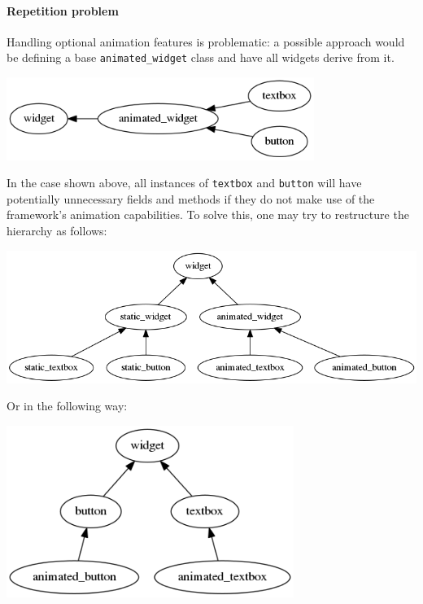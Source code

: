 \documentclass[oneside, 12pt, a4paper, openany]{book}
\let\origfigure=\figure
\let\endorigfigure=\endfigure
\renewenvironment{figure}[1][]{%
\origfigure[H]
}{%
\endorigfigure
}
\begin{document}
\paragraph{Repetition problem}\label{repetition-problem}

Handling optional animation features is problematic: a possible approach
would be defining a base
\texttt{animated_widget}
class and have all widgets derive from it.

\begin{figure}
\centering
\includegraphics[width=0.75000\textwidth]{source/figures/generated/ecs/overview/oop/repetition_problem_0.png}
\caption{OOP encoding issue: repetition \#0}
\end{figure}

In the case shown above, all instances of
\texttt{textbox}
and
\texttt{button}
will have potentially unnecessary fields and methods if they do not make
use of the framework's animation capabilities. To solve this, one may
try to restructure the hierarchy as follows:

\begin{figure}
\centering
\includegraphics{source/figures/generated/ecs/overview/oop/repetition_problem_1.png}
\caption{OOP encoding issue: repetition \#1}
\end{figure}

Or in the following way:

\begin{figure}
\centering
\includegraphics[width=0.70000\textwidth]{source/figures/generated/ecs/overview/oop/repetition_problem_2.png}
\caption{OOP encoding issue: repetition \#2}
\end{figure}
\end{document}
